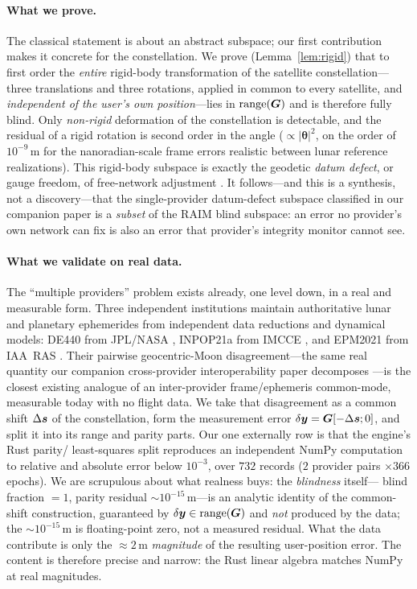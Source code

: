 \paragraph{What we prove.}
The classical statement is about an abstract subspace; our first contribution makes it
concrete for the constellation. We prove (Lemma~\ref{lem:rigid}) that to first order
the \emph{entire} rigid-body transformation of the satellite constellation---three
translations and three rotations, applied in common to every satellite, and
\emph{independent of the user's own position}---lies in $\operatorname{range}(\bm{G})$ and is therefore
fully blind. Only \emph{non-rigid} deformation of the constellation is detectable, and
the residual of a rigid rotation is second order in the angle
($\propto|\bm\theta|^2$, on the order of $10^{-9}\,$m for the nanoradian-scale frame
errors realistic between lunar reference realizations). This rigid-body subspace is
exactly the geodetic \emph{datum defect}, or gauge freedom, of free-network adjustment
\citep{baarda1973,teunissen2000}. It follows---and this is a synthesis, not a
discovery---that the single-provider datum-defect subspace classified in our companion
paper \citep{baweja2026datum} is a \emph{subset} of the RAIM blind subspace: an error
no provider's own network can fix is also an error that provider's integrity monitor
cannot see.

\paragraph{What we validate on real data.}
The ``multiple providers'' problem exists already, one level down, in a real and
measurable form. Three independent institutions maintain authoritative lunar and
planetary ephemerides from independent data reductions and dynamical models: DE440 from
JPL/NASA \citep{park2021de440}, INPOP21a from IMCCE \citep{fienga2021inpop21a}, and
EPM2021 from IAA~RAS \citep{pitjeva2021epm2021}. Their pairwise geocentric-Moon
disagreement---the same real quantity our companion cross-provider interoperability
paper decomposes \citep{baweja2026interop}---is the closest existing analogue of an
inter-provider frame/ephemeris common-mode, measurable today with no flight data. We
take that disagreement as a common shift $\Delta\bm{s}$ of the constellation, form the
measurement error $\delta\bm{y}=\bm{G}[-\Delta\bm{s};0]$, and split it into its range and parity
parts. Our one externally \Validated{} row is that the engine's Rust parity/%
least-squares split reproduces an independent NumPy computation to relative and
absolute error below $10^{-3}$, over $732$ records ($2$ provider pairs $\times366$
epochs). We are scrupulous about what realness buys: the \emph{blindness} itself---%
blind fraction $=1$, parity residual $\sim\!10^{-15}\,$m---is an analytic identity of
the common-shift construction, guaranteed by $\delta\bm{y}\in\operatorname{range}(\bm{G})$ and \emph{not}
produced by the data; the $\sim\!10^{-15}\,$m is floating-point zero, not a measured
residual. What the data contribute is only the $\approx\!2\,$m \emph{magnitude} of the
resulting user-position error. The \Validated{} content is therefore precise and
narrow: the Rust linear algebra matches NumPy at real magnitudes.


